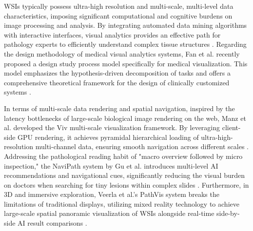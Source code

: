 \documentclass[journal]{vgtc}                     %
\begin{document}
WSIs typically possess ultra-high resolution and multi-scale, multi-level data characteristics, imposing significant computational and cognitive burdens on image processing and analysis. By integrating automated data mining algorithms with interactive interfaces, visual analytics provides an effective path for pathology experts to efficiently understand complex tissue structures \cite{xu2025intelligent}. Regarding the design methodology of medical visual analytics systems, Fan et al. recently proposed a design study process model specifically for medical visualization. This model emphasizes the hypothesis-driven decomposition of tasks and offers a comprehensive theoretical framework for the design of clinically customized systems \cite{fan2026design}.

In terms of multi-scale data rendering and spatial navigation, inspired by the latency bottlenecks of large-scale biological image rendering on the web, Manz et al. developed the Viv multi-scale visualization framework. By leveraging client-side GPU rendering, it achieves pyramidal hierarchical loading of ultra-high-resolution multi-channel data, ensuring smooth navigation across different scales \cite{manz2022viv}. Addressing the pathological reading habit of "macro overview followed by micro inspection," the NaviPath system by Gu et al. introduces multi-level AI recommendations and navigational cues, significantly reducing the visual burden on doctors when searching for tiny lesions within complex slides \cite{gu2023augmenting}. Furthermore, in 3D and immersive exploration, Veerla et al.'s PathVis system breaks the limitations of traditional displays, utilizing mixed reality technology to achieve large-scale spatial panoramic visualization of WSIs alongside real-time side-by-side AI result comparisons \cite{veerla2025beyond}.
\end{document}

